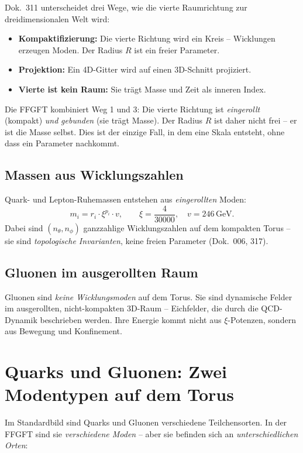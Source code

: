 \documentclass[11pt,a4paper]{article}
\begin{document}
	Dok.~311 unterscheidet drei Wege, wie die vierte Raumrichtung zur dreidimensionalen Welt wird:
	\begin{itemize}
		\item \textbf{Kompaktifizierung:} Die vierte Richtung wird ein Kreis -- Wicklungen erzeugen Moden. Der Radius \(R\) ist ein freier Parameter.
		\item \textbf{Projektion:} Ein 4D-Gitter wird auf einen 3D-Schnitt projiziert.
		\item \textbf{Vierte ist kein Raum:} Sie trägt Masse und Zeit als inneren Index.
	\end{itemize}
	
	Die FFGFT kombiniert Weg 1 und 3: Die vierte Richtung ist \emph{eingerollt} (kompakt) \emph{und} \emph{gebunden} (sie trägt Masse). 
	Der Radius \(R\) ist daher nicht frei -- er ist die Masse selbst. 
	Dies ist der einzige Fall, in dem eine Skala entsteht, ohne dass ein Parameter nachkommt.
	
	\subsection{Massen aus Wicklungszahlen}
	
	Quark- und Lepton-Ruhemassen entstehen aus \emph{eingerollten} Moden:
	\[
	m_i = r_i \cdot \xi^{p_i} \cdot v, \qquad \xi = \frac{4}{30000}, \quad v = 246\,\text{GeV}.
	\]
	Dabei sind \((n_\theta, n_\phi)\) ganzzahlige Wicklungszahlen auf dem kompakten Torus -- sie sind \emph{topologische Invarianten}, keine freien Parameter (Dok.~006, 317).
	
	\subsection{Gluonen im ausgerollten Raum}
	
	Gluonen sind \emph{keine Wicklungsmoden} auf dem Torus. 
	Sie sind dynamische Felder im ausgerollten, nicht-kompakten 3D-Raum -- Eichfelder, die durch die QCD-Dynamik beschrieben werden. 
	Ihre Energie kommt nicht aus \(\xi\)-Potenzen, sondern aus Bewegung und Konfinement.
	
	\section{Quarks und Gluonen: Zwei Modentypen auf dem Torus}
	
	Im Standardbild sind Quarks und Gluonen verschiedene Teilchensorten. 
	In der FFGFT sind sie \emph{verschiedene Moden} -- aber sie befinden sich an \emph{unterschiedlichen Orten}:
	
\end{document}
